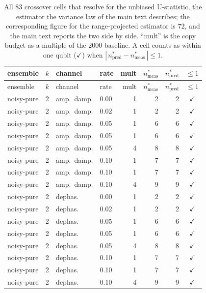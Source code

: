 \documentclass[a4paper,superscriptaddress,nofootinbib,onecolumn,nopdfoutputerror]{quantumarticle}
\begin{document}
\begin{center}
\footnotesize
\setlength{\tabcolsep}{5pt}
\begin{longtable}{@{}llllrrrc@{}}
\caption{All \(83\) crossover cells that resolve for the unbiased
U-statistic, the estimator the variance law of the main text describes; the
corresponding figure for the range-projected estimator is \(72\), and the
main text reports the two side by side. ``mult'' is the copy budget as
a multiple of the \(2000\) baseline. A cell counts as within one qubit
(\(\checkmark\)) when \(|\,n^*_{\text{pred}} - n^*_{\text{meas}}\,| \le 1\).}
\label{tab:cells}\\
\toprule
ensemble & \(k\) & channel & rate & mult & \(n^*_{\text{meas}}\) & \(n^*_{\text{pred}}\) & \(\le 1\) \\
\midrule
\endfirsthead
\toprule
ensemble & \(k\) & channel & rate & mult & \(n^*_{\text{meas}}\) & \(n^*_{\text{pred}}\) & \(\le 1\) \\
\midrule
\endhead
noisy-pure & 2 & amp.\ damp. & 0.00 & 1 & 2 & 2 & $\checkmark$ \\
noisy-pure & 2 & amp.\ damp. & 0.02 & 1 & 2 & 2 & $\checkmark$ \\
noisy-pure & 2 & amp.\ damp. & 0.05 & 1 & 6 & 6 & $\checkmark$ \\
noisy-pure & 2 & amp.\ damp. & 0.05 & 1 & 6 & 6 & $\checkmark$ \\
noisy-pure & 2 & amp.\ damp. & 0.05 & 4 & 8 & 8 & $\checkmark$ \\
noisy-pure & 2 & amp.\ damp. & 0.10 & 1 & 7 & 7 & $\checkmark$ \\
noisy-pure & 2 & amp.\ damp. & 0.10 & 1 & 7 & 7 & $\checkmark$ \\
noisy-pure & 2 & amp.\ damp. & 0.10 & 4 & 9 & 9 & $\checkmark$ \\
noisy-pure & 2 & dephas. & 0.00 & 1 & 2 & 2 & $\checkmark$ \\
noisy-pure & 2 & dephas. & 0.02 & 1 & 2 & 2 & $\checkmark$ \\
noisy-pure & 2 & dephas. & 0.05 & 1 & 6 & 6 & $\checkmark$ \\
noisy-pure & 2 & dephas. & 0.05 & 1 & 6 & 6 & $\checkmark$ \\
noisy-pure & 2 & dephas. & 0.05 & 4 & 8 & 8 & $\checkmark$ \\
noisy-pure & 2 & dephas. & 0.10 & 1 & 7 & 7 & $\checkmark$ \\
noisy-pure & 2 & dephas. & 0.10 & 1 & 7 & 7 & $\checkmark$ \\
noisy-pure & 2 & dephas. & 0.10 & 4 & 9 & 9 & $\checkmark$ \\

\end{longtable}
\end{center}
\end{document}
